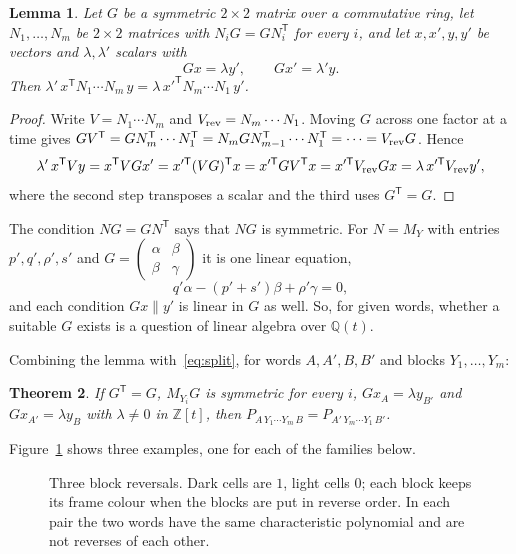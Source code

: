 \documentclass[11pt]{article}
\newtheorem{theorem}{Theorem}
\newtheorem{lemma}[theorem]{Lemma}
\theoremstyle{remark}
\newcommand{\T}{^{\mathsf T}}
\begin{document}
\begin{lemma}\label{lem:block}
Let $G$ be a symmetric $2\times2$ matrix over a commutative ring, let $N_1,\dots,N_m$ be $2\times2$ matrices with
$N_iG=GN_i\T$ for every $i$, and let $x,x',y,y'$ be vectors and $\lambda,\lambda'$ scalars with
\[
Gx=\lambda y',\qquad Gx'=\lambda' y .
\]
Then $\lambda'\,x\T N_1\cdots N_m\,y=\lambda\,x'^{\mathsf T} N_m\cdots N_1\,y'$.
\end{lemma}

\begin{proof}
Write $V=N_1\cdots N_m$ and $V_{\rm rev}=N_m\cdots N_1$. Moving $G$ across one factor at a time gives
$GV\T=GN_m\T\cdots N_1\T=N_mGN_{m-1}\T\cdots N_1\T=\dots=V_{\rm rev}G$. Hence
\[
\lambda'\,x\T Vy=x\T VGx'=x'^{\mathsf T}(VG)\T x=x'^{\mathsf T}GV\T x=x'^{\mathsf T}V_{\rm rev}Gx=\lambda\,x'^{\mathsf T}V_{\rm rev}y' ,
\]
where the second step transposes a scalar and the third uses $G\T=G$.
\end{proof}

The condition $NG=GN\T$ says that $NG$ is symmetric. For $N=M_Y$ with entries $p',q',\rho',s'$ and
$G=\left(\begin{smallmatrix}\alpha&\beta\\ \beta&\gamma\end{smallmatrix}\right)$ it is one linear equation,
\begin{equation}\label{eq:lin}
q'\alpha-(p'+s')\beta+\rho'\gamma=0 ,
\end{equation}
and each condition $Gx\parallel y'$ is linear in $G$ as well. So, for given words, whether a suitable $G$ exists is a
question of linear algebra over $\mathbb{Q}(t)$.

Combining the lemma with~\eqref{eq:split}, for words $A,A',B,B'$ and blocks $Y_1,\dots,Y_m$:

\begin{theorem}\label{thm:words}
If $G\T=G$, $M_{Y_i}G$ is symmetric for every $i$, $Gx_A=\lambda y_{B'}$ and $Gx_{A'}=\lambda y_B$ with
$\lambda\ne0$ in $\mathbb{Z}[t]$, then $P_{A\,Y_1\cdots Y_m\,B}=P_{A'\,Y_m\cdots Y_1\,B'}$.
\end{theorem}

Figure~\ref{fig:blocks} shows three examples, one for each of the families below.

\begin{figure}[ht]
\centering

\caption{Three block reversals. Dark cells are $1$, light cells $0$; each block keeps its frame colour when the
blocks are put in reverse order. In each pair the two words have the same characteristic polynomial and are not
reverses of each other.}
\label{fig:blocks}
\end{figure}
\end{document}
